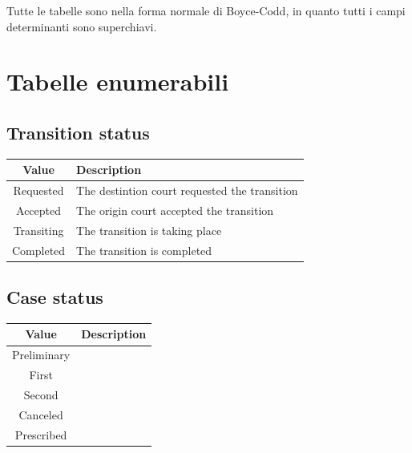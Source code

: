 \documentclass{article}
\begin{document}
{Tutte le tabelle sono nella forma normale di Boyce-Codd, in quanto tutti i
campi determinanti sono superchiavi.

\section{Tabelle enumerabili}

\subsection{Transition status}
\begin{table}[h]
    \begin{center}
        \begin{tabular}{c|l}
            \toprule
            \textbf{Value} &
            \textbf{Description}                                           \\
            \midrule
            Requested      & The destintion court requested the transition \\
            Accepted       & The origin court accepted the transition      \\
            Transiting     & The transition is taking place                \\
            Completed      & The transition is completed                   \\
            \bottomrule
        \end{tabular}
    \end{center}
\end{table}

\subsection{Case status}
\begin{table}[h]
    \begin{center}
        \begin{tabular}{c|l}
            \toprule
            \textbf{Value} &
            \textbf{Description} \\
            \midrule
            Preliminary    &     \\
            First          &     \\
            Second         &     \\
            Canceled       &     \\
            Prescribed     &     \\
            \bottomrule
        \end{tabular}
    \end{center}
\end{table}

}
\end{document}
